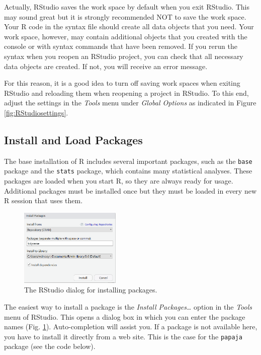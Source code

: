 \documentclass[doc,floatsintext]{apa6}
\begin{document}
Actually, RStudio saves the work space by default when you exit RStudio.
This may sound great but it is strongly recommended NOT to save the work
space. Your R code in the syntax file should create all data objects
that you need. Your work space, however, may contain additional objects
that you created with the console or with syntax commands that have been
removed. If you rerun the syntax when you reopen an RStudio project, you
can check that all necessary data objects are created. If not, you will
receive an error message.

For this reason, it is a good idea to turn off saving work spaces when
exiting RStudio and reloading them when reopening a project in RStudio.
To this end, adjust the settings in the \emph{Tools} menu under
\emph{Global Options} as indicated in Figure \ref{fig:RStudiosettings}.

\subsection{Install and Load Packages}\label{packages}

The base installation of R includes several important packages, such as
the \texttt{base} package and the \texttt{stats} package, which contains
many statistical analyses. These packages are loaded when you start R,
so they are always ready for usage. Additional packages must be
installed once but they must be loaded in every new R session that uses
them.

\begin{figure}
\includegraphics[width=1.9in]{installpackage} \caption{The RStudio dialog for installing packages.}\label{fig:installscreen}
\end{figure}

The easiest way to install a package is the \emph{Install
Packages\ldots{}} option in the \emph{Tools} menu of RStudio. This opens
a dialog box in which you can enter the package names (Fig.
\ref{fig:installscreen}). Auto-completion will assist you. If a package
is not available here, you have to install it directly from a web site.
This is the case for the \texttt{papaja} package (see the code below).
\end{document}
